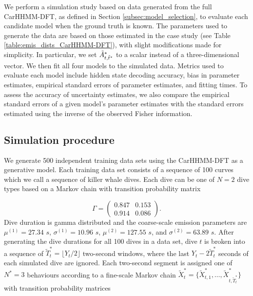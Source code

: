 
We perform a simulation study based on data generated from the full CarHHMM-DFT, as defined in Section \ref{subsec:model_selection}, to evaluate each candidate model when the ground truth is known. The parameters used to generate the data are based on those estimated in the case study (see Table \ref{table:emis_dists_CarHHMM-DFT}), with slight modifications made for simplicity. In particular, we set $\tilde{A}^*_{t,\tilde t^*}$ to a scalar instead of a three-dimensional vector. We then fit all four models to the simulated data. Metrics used to evaluate each model include hidden state decoding accuracy, bias in parameter estimates, empirical standard errors of parameter estimates, and fitting times. To assess the accuracy of uncertainty estimates, we also compare the empirical standard errors of a given model's parameter estimates with the standard errors estimated using the inverse of the observed Fisher information.

\subsection{Simulation procedure}
\label{subsec:data_simulation}

We generate 500 independent training data sets using the CarHHMM-DFT as a generative model. Each training data set consists of a sequence of 100 curves which we call a sequence of killer whale dives. Each dive can be one of $N=2$ dive types based on a Markov chain with transition probability matrix

\[\Gamma = \begin{pmatrix} 0.847 & 0.153 \\ 0.914 & 0.086 \end{pmatrix}.\]
%
Dive duration is gamma distributed and the coarse-scale emission parameters are $\mu^{(1)} = 27.34$ $s$, $\sigma^{(1)} = 10.96$ $s$, $\mu^{(2)} = 127.55$ $s$, and $\sigma^{(2)} = 63.89$ $s$.
%
After generating the dive durations for all 100 dives in a data set, dive $t$ is broken into a sequence of $\tilde T^*_t = \lfloor Y_t/2 \rfloor$ two-second windows, where the last $Y_t - 2 \tilde T^*_t$ seconds of each simulated dive are ignored. Each two-second segment is assigned one of $N^*=3$ behaviours according to a fine-scale Markov chain $\tilde X^*_t = \big\{\tilde X^*_{t,1}, \ldots, \tilde X^*_{t,\tilde T^*_t} \big\}$ with transition probability matrices

